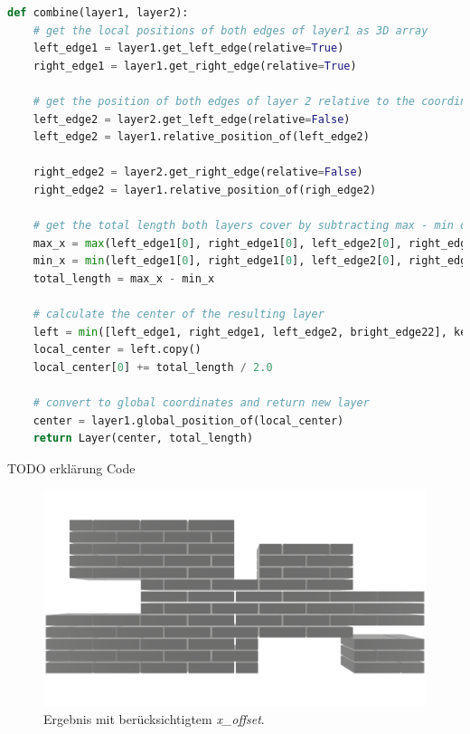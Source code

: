 \begin{lstlisting}[language=Python, caption=Pseudocode zur Vereinigung zweier sich berührender oder überlappender Schichten von zwei nach den Voraussetzungen aus Abschnitt~\ref{concept:combination_properties} kombinierbaren Wandstücken.]
  def combine(layer1, layer2):
    # get the local positions of both edges of layer1 as 3D array
    left_edge1 = layer1.get_left_edge(relative=True)
    right_edge1 = layer1.get_right_edge(relative=True)

    # get the position of both edges of layer 2 relative to the coordinate systsem of layer1 as 3D array
    left_edge2 = layer2.get_left_edge(relative=False)
    left_edge2 = layer1.relative_position_of(left_edge2)

    right_edge2 = layer2.get_right_edge(relative=False)
    right_edge2 = layer1.relative_position_of(righ_edge2)

    # get the total length both layers cover by subtracting max - min of the x coordinates
    max_x = max(left_edge1[0], right_edge1[0], left_edge2[0], right_edge2[0]) 
    min_x = min(left_edge1[0], right_edge1[0], left_edge2[0], right_edge2[0]) 
    total_length = max_x - min_x

    # calculate the center of the resulting layer
    left = min([left_edge1, right_edge1, left_edge2, bright_edge22], key=lambda x: x[0])
    local_center = left.copy()
    local_center[0] += total_length / 2.0

    # convert to global coordinates and return new layer
    center = layer1.global_position_of(local_center)
    return Layer(center, total_length)

\end{lstlisting}

TODO erklärung Code

\begin{figure}[ht!]
  \centering
  \includegraphics[width=0.8\columnwidth]{fig/Real_Combination_Output.png}
  \caption{Ergebnis mit berücksichtigtem \textit{x\_offset}.}
  \label{fig:real:combination_example_solution_xoffset}
\end{figure}

